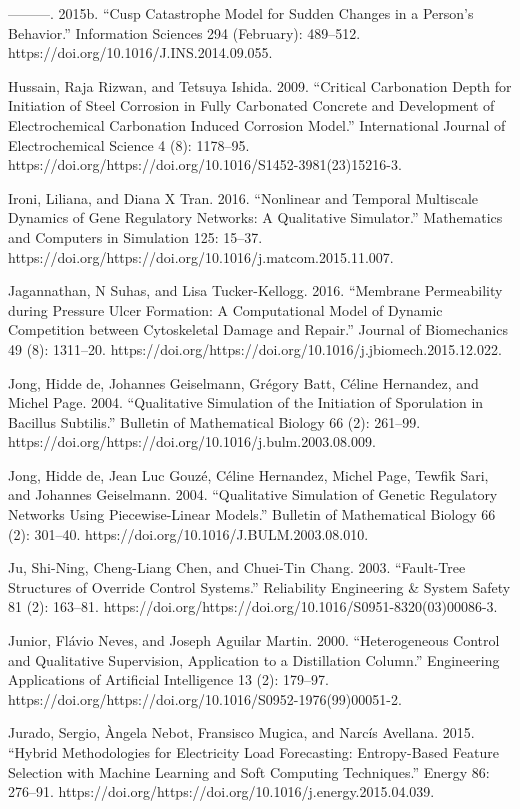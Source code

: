 \documentclass[utf8]{gradu3}
\begin{document}
———. 2015b. “Cusp Catastrophe Model for Sudden Changes in a Person’s Behavior.” Information Sciences 294 (February): 489–512. https://doi.org/10.1016/J.INS.2014.09.055.

Hussain, Raja Rizwan, and Tetsuya Ishida. 2009. “Critical Carbonation Depth for Initiation of Steel Corrosion in Fully Carbonated Concrete and Development of Electrochemical Carbonation Induced Corrosion Model.” International Journal of Electrochemical Science 4 (8): 1178–95. https://doi.org/https://doi.org/10.1016/S1452-3981(23)15216-3.

Ironi, Liliana, and Diana X Tran. 2016. “Nonlinear and Temporal Multiscale Dynamics of Gene Regulatory Networks: A Qualitative Simulator.” Mathematics and Computers in Simulation 125: 15–37. https://doi.org/https://doi.org/10.1016/j.matcom.2015.11.007.

Jagannathan, N Suhas, and Lisa Tucker-Kellogg. 2016. “Membrane Permeability during Pressure Ulcer Formation: A Computational Model of Dynamic Competition between Cytoskeletal Damage and Repair.” Journal of Biomechanics 49 (8): 1311–20. https://doi.org/https://doi.org/10.1016/j.jbiomech.2015.12.022.

Jong, Hidde de, Johannes Geiselmann, Grégory Batt, Céline Hernandez, and Michel Page. 2004. “Qualitative Simulation of the Initiation of Sporulation in Bacillus Subtilis.” Bulletin of Mathematical Biology 66 (2): 261–99. https://doi.org/https://doi.org/10.1016/j.bulm.2003.08.009.

Jong, Hidde de, Jean Luc Gouzé, Céline Hernandez, Michel Page, Tewfik Sari, and Johannes Geiselmann. 2004. “Qualitative Simulation of Genetic Regulatory Networks Using Piecewise-Linear Models.” Bulletin of Mathematical Biology 66 (2): 301–40. https://doi.org/10.1016/J.BULM.2003.08.010.

Ju, Shi-Ning, Cheng-Liang Chen, and Chuei-Tin Chang. 2003. “Fault-Tree Structures of Override Control Systems.” Reliability Engineering \& System Safety 81 (2): 163–81. https://doi.org/https://doi.org/10.1016/S0951-8320(03)00086-3.

Junior, Flávio Neves, and Joseph Aguilar Martin. 2000. “Heterogeneous Control and Qualitative Supervision, Application to a Distillation Column.” Engineering Applications of Artificial Intelligence 13 (2): 179–97. https://doi.org/https://doi.org/10.1016/S0952-1976(99)00051-2.

Jurado, Sergio, Àngela Nebot, Fransisco Mugica, and Narcís Avellana. 2015. “Hybrid Methodologies for Electricity Load Forecasting: Entropy-Based Feature Selection with Machine Learning and Soft Computing Techniques.” Energy 86: 276–91. https://doi.org/https://doi.org/10.1016/j.energy.2015.04.039.
\end{document}
